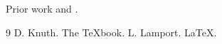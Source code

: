 \documentclass{article}
\begin{document}
Prior work \cite{knuth} and \cite{lamport}.
\begin{thebibliography}{9}
 D. Knuth. The TeXbook.
 L. Lamport. LaTeX.
\end{thebibliography}
\end{document}
